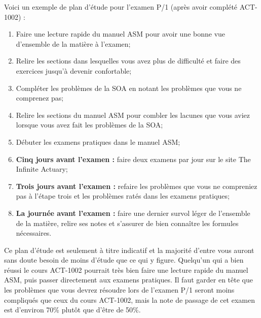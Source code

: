 Voici un exemple de plan d'étude pour l'examen P/1 (après avoir complété ACT-1002) :
\begin{enumerate}
\item Faire une lecture rapide du manuel ASM pour avoir une bonne vue d'ensemble de la matière à l'examen;
\item Relire les sections dans lesquelles vous avez plus de difficulté et faire des exercices jusqu'à devenir confortable;
\item Compléter les problèmes de la SOA en notant les problèmes que vous ne comprenez pas;
\item Relire les sections du manuel ASM pour combler les lacunes que vous aviez lorsque vous avez fait les problèmes de la SOA;
\item Débuter les examens pratiques dans le manuel ASM;
\item \textbf{Cinq jours avant l'examen :} faire deux examens par jour sur le site The Infinite Actuary;
\item \textbf{Trois jours avant l'examen :} refaire les problèmes que vous ne compreniez pas à l'étape trois et les problèmes ratés dans les examens pratiques;
\item \textbf{La journée avant l'examen :} faire une dernier survol léger de l'ensemble de la matière, relire ses notes et s'assurer de bien connaître les formules nécessaires.
\end{enumerate}
\vspace{\baselineskip}

Ce plan d'étude est seulement à titre indicatif et la majorité d'entre vous auront sans doute besoin de moins d'étude que ce qui y figure. Quelqu'un qui a bien réussi le cours ACT-1002 pourrait très bien faire une lecture rapide du manuel ASM, puis passer directement aux examens pratiques. Il faut garder en tête que les problèmes que vous devrez résoudre lors de l'examen P/1 seront moins compliqués que ceux du cours ACT-1002, mais la note de passage de cet examen est d'environ 70\% plutôt que d'être de 50\%. 

\newpage
